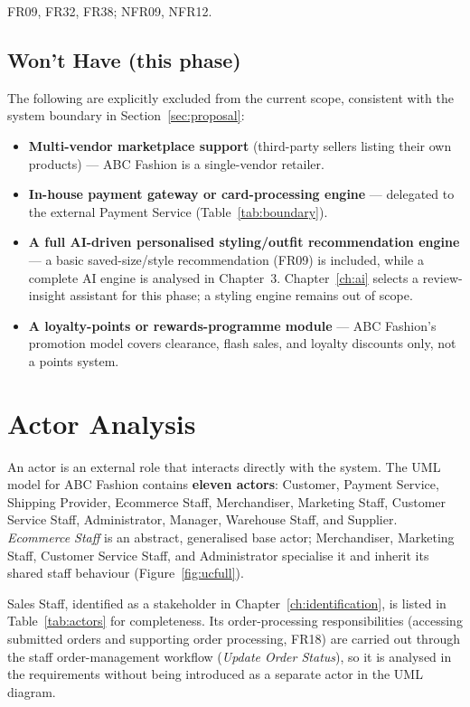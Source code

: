 \documentclass[11pt,a4paper,oneside]{extreport}
\newif\ifshowvtwo
\newcommand{\upd}[1]{\ifshowvtwo\textcolor{red}{#1}\else#1\fi}
\begin{document}
FR09, FR32, FR38; NFR09, NFR12.

\subsection{Won't Have (this phase)}
The following are explicitly excluded from the current scope, consistent with the system boundary in Section~\ref{sec:proposal}:
\begin{itemize}
  \item \textbf{Multi-vendor marketplace support} (third-party sellers listing their own products) --- ABC Fashion is a single-vendor retailer.
  \item \textbf{In-house payment gateway or card-processing engine} --- delegated to the external Payment Service (Table~\ref{tab:boundary}).
  \item \textbf{A full AI-driven personalised styling/outfit recommendation engine} --- a basic saved-size/style recommendation (FR09) is included, while a complete AI engine is analysed in Chapter~3. \upd{Chapter~\ref{ch:ai} selects a review-insight assistant for this phase; a styling engine remains out of scope.}
  \item \textbf{A loyalty-points or rewards-programme module} --- ABC Fashion's promotion model covers clearance, flash sales, and loyalty discounts only, not a points system.
\end{itemize}

\section{Actor Analysis}
\label{sec:actors}
An actor is an external role that interacts directly with the system. The UML model for ABC Fashion contains \textbf{eleven actors}: Customer, Payment Service, Shipping Provider, Ecommerce Staff, Merchandiser, Marketing Staff, Customer Service Staff, Administrator, Manager, Warehouse Staff, and Supplier. \emph{Ecommerce Staff} is an abstract, generalised base actor; Merchandiser, Marketing Staff, Customer Service Staff, and Administrator specialise it and inherit its shared staff behaviour (Figure~\ref{fig:ucfull}).

Sales Staff, identified as a stakeholder in Chapter~\ref{ch:identification}, is listed in Table~\ref{tab:actors} for completeness. Its order-processing responsibilities (accessing submitted orders and supporting order processing, FR18) are carried out through the staff order-management workflow (\emph{Update Order Status}), so it is analysed in the requirements without being introduced as a separate actor in the UML diagram.
\end{document}
